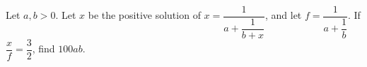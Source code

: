 Let $a,b>0$. Let $x$ be the positive solution of $x=\dfrac{1}{a+\dfrac{1}{b+x}}$, and let $f=\dfrac{1}{a+\dfrac{1}{b}}$. If $\dfrac{x}{f}=\dfrac{3}{2}$, find $100ab$.
